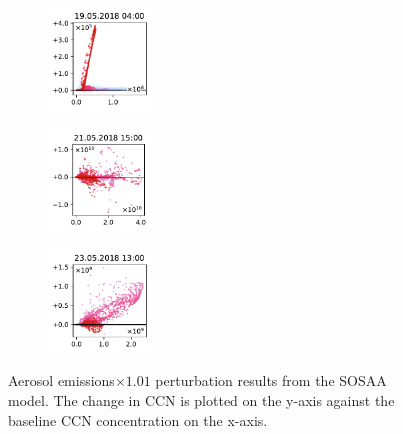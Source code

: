 \begin{figure}[H]
    \begin{subfigure}
        \centering
        \includegraphics[width=0.30\textwidth,valign=t]{evaluation/figures/perturbations/perturbation-19.05.2018:04.00-aerosols-mul-1.01.pdf}
    \end{subfigure}
    \begin{subfigure}
        \centering
        \includegraphics[width=0.30\textwidth,valign=t]{evaluation/figures/perturbations/perturbation-21.05.2018:15.00-aerosols-mul-1.01.pdf}
    \end{subfigure}
    \begin{subfigure}
        \centering
        \includegraphics[width=0.30\textwidth,valign=t]{evaluation/figures/perturbations/perturbation-23.05.2018:13.00-aerosols-mul-1.01.pdf}
    \end{subfigure}

    \caption[Aerosol emissions$\times 1.01$ perturbation SOSAA results]{Aerosol emissions$\times 1.01$ perturbation results from the SOSAA model. The change in CCN is plotted on the y-axis against the baseline CCN concentration on the x-axis.}
    \label{fig:sosaa-perturbation-aerosols-mul-1.01}
\end{figure}

